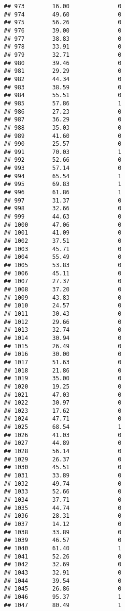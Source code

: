\documentclass[
]{article}
\begin{document}
\begin{verbatim}
## 973        16.00              0
## 974        49.60              0
## 975        56.26              0
## 976        39.00              0
## 977        38.83              0
## 978        33.91              0
## 979        32.71              0
## 980        39.46              0
## 981        29.29              0
## 982        44.34              0
## 983        38.59              0
## 984        55.51              0
## 985        57.86              1
## 986        27.23              0
## 987        36.29              0
## 988        35.03              0
## 989        41.60              0
## 990        25.57              0
## 991        70.03              1
## 992        52.66              0
## 993        57.14              0
## 994        65.54              1
## 995        69.83              1
## 996        61.86              1
## 997        31.37              0
## 998        32.66              0
## 999        44.63              0
## 1000       47.06              0
## 1001       41.09              0
## 1002       37.51              0
## 1003       45.71              0
## 1004       55.49              0
## 1005       53.83              0
## 1006       45.11              0
## 1007       27.37              0
## 1008       37.20              0
## 1009       43.83              0
## 1010       24.57              0
## 1011       30.43              0
## 1012       29.66              0
## 1013       32.74              0
## 1014       30.94              0
## 1015       26.49              0
## 1016       30.00              0
## 1017       51.63              0
## 1018       21.86              0
## 1019       35.00              0
## 1020       19.25              0
## 1021       47.03              0
## 1022       30.97              0
## 1023       17.62              0
## 1024       47.71              0
## 1025       68.54              1
## 1026       41.03              0
## 1027       44.89              0
## 1028       56.14              0
## 1029       26.37              0
## 1030       45.51              0
## 1031       33.89              0
## 1032       49.74              0
## 1033       52.66              0
## 1034       37.71              0
## 1035       44.74              0
## 1036       28.31              0
## 1037       14.12              0
## 1038       33.89              0
## 1039       46.57              0
## 1040       61.40              1
## 1041       52.26              0
## 1042       32.69              0
## 1043       32.91              0
## 1044       39.54              0
## 1045       26.86              0
## 1046       95.37              1
## 1047       80.49              1

\end{verbatim}
\end{document}
